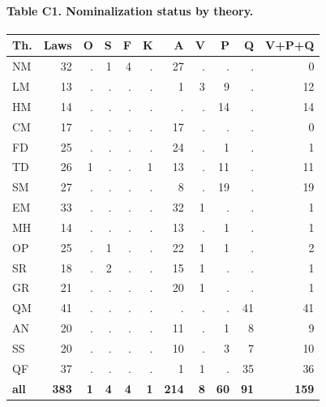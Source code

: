 \paragraph{Table C1. Nominalization status by theory.}
{\footnotesize\setlength{\tabcolsep}{3pt}
\begin{center}
\begin{tabular}{l r r r r r r r r r r}
\toprule
Th. & Laws & O & S & F & K & A & V & P & Q & V+P+Q \\
\midrule
NM & 32 & . & 1 & 4 & . & 27 & . & . & . & 0 \\
LM & 13 & . & . & . & . & 1 & 3 & 9 & . & 12 \\
HM & 14 & . & . & . & . & . & . & 14 & . & 14 \\
CM & 17 & . & . & . & . & 17 & . & . & . & 0 \\
FD & 25 & . & . & . & . & 24 & . & 1 & . & 1 \\
TD & 26 & 1 & . & . & 1 & 13 & . & 11 & . & 11 \\
SM & 27 & . & . & . & . & 8 & . & 19 & . & 19 \\
EM & 33 & . & . & . & . & 32 & 1 & . & . & 1 \\
MH & 14 & . & . & . & . & 13 & . & 1 & . & 1 \\
OP & 25 & . & 1 & . & . & 22 & 1 & 1 & . & 2 \\
SR & 18 & . & 2 & . & . & 15 & 1 & . & . & 1 \\
GR & 21 & . & . & . & . & 20 & 1 & . & . & 1 \\
QM & 41 & . & . & . & . & . & . & . & 41 & 41 \\
AN & 20 & . & . & . & . & 11 & . & 1 & 8 & 9 \\
SS & 20 & . & . & . & . & 10 & . & 3 & 7 & 10 \\
QF & 37 & . & . & . & . & 1 & 1 & . & 35 & 36 \\
\textbf{all} & \textbf{383} & \textbf{1} & \textbf{4} & \textbf{4} & \textbf{1} & \textbf{214} & \textbf{8} & \textbf{60} & \textbf{91} & \textbf{159} \\
\bottomrule
\end{tabular}
\end{center}
}
